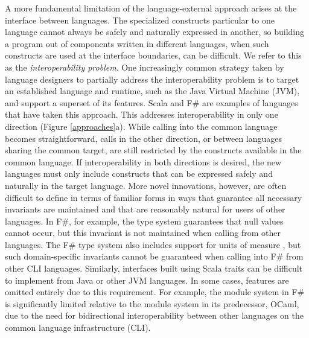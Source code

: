 A more fundamental limitation of the language-external approach arises at the interface between languages. The specialized constructs particular to one language cannot always be safely and naturally expressed in another, so building a program out of components written in different languages, when such constructs are used at the interface boundaries, can be difficult. We refer to this as the \emph{interoperability problem}. One increasingly common strategy taken by language designers to partially address the interoperability problem is to target an established language and runtime, such as the Java Virtual Machine (JVM), and support a superset of its features. Scala \cite{scala} and F\# \cite{fsharp} are examples of languages that have taken this approach. This addresses interoperability in only one direction (Figure \ref{approaches}a). While calling into the common language becomes straightforward, calls in the other direction, or between languages sharing the common target, are still restricted by the constructs available in the common language. If interoperability in both directions is desired, the new languages must only include constructs that can be expressed safely and naturally in the target language. More novel innovations, however, are often difficult to define in terms of familiar forms in ways that guarantee all necessary invariants are maintained and that are reasonably natural for users of other languages. In F\#, for example, the type system guarantees that null values cannot occur, but this invariant is not maintained when calling from other languages. The F\# type system also includes support for units of measure \cite{fsharpunits}, but such domain-specific invariants cannot be guaranteed when calling into F\# from other CLI languages. Similarly, interfaces built using Scala traits can be difficult to implement from Java or other JVM languages. In some cases, features are omitted entirely due to this requirement. For example, the module system in F\# is significantly limited relative to the module system in its predecessor, OCaml, due to the need for bidirectional interoperability between other languages on the common language infrastructure (CLI). 

